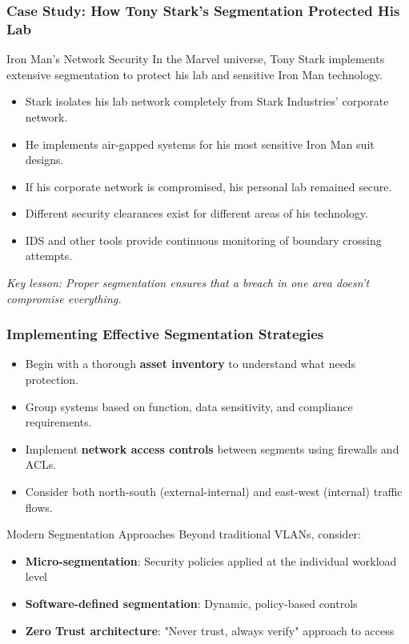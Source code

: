 \documentclass{beamer}
\begin{document}
\begin{frame}
    \frametitle{Case Study: How Tony Stark's Segmentation Protected His Lab}
    
    \begin{exampleblock}{Iron Man's Network Security}
    In the Marvel universe, Tony Stark implements extensive segmentation to protect his lab and sensitive Iron Man technology.
    \end{exampleblock}
    
    \begin{itemize}
    \item Stark isolates his lab network completely from Stark Industries' corporate network.
    \item He implements air-gapped systems for his most sensitive Iron Man suit designs.
    \item If his corporate network is compromised, his personal lab remained secure.
    \item Different security clearances exist for different areas of his technology.
    \item IDS and other tools provide continuous monitoring of boundary crossing attempts.
    \end{itemize}
    
    \vspace{0.3cm}
    \textit{Key lesson: Proper segmentation ensures that a breach in one area doesn't compromise everything.}
    \end{frame}
    
    \begin{frame}
    \frametitle{Implementing Effective Segmentation Strategies}
    
    \begin{itemize}
    \item Begin with a thorough \textbf{asset inventory} to understand what needs protection.
    \item Group systems based on function, data sensitivity, and compliance requirements.
    \item Implement \textbf{network access controls} between segments using firewalls and ACLs.
    \item Consider both north-south (external-internal) and east-west (internal) traffic flows.
    \end{itemize}
    
    \begin{alertblock}{Modern Segmentation Approaches}
    Beyond traditional VLANs, consider:
    \begin{itemize}
    \item \textbf{Micro-segmentation}: Security policies applied at the individual workload level
    \item \textbf{Software-defined segmentation}: Dynamic, policy-based controls
    \item \textbf{Zero Trust architecture}: "Never trust, always verify" approach to access
    \end{itemize}
    \end{alertblock}
    \end{frame}
    
\end{document}
